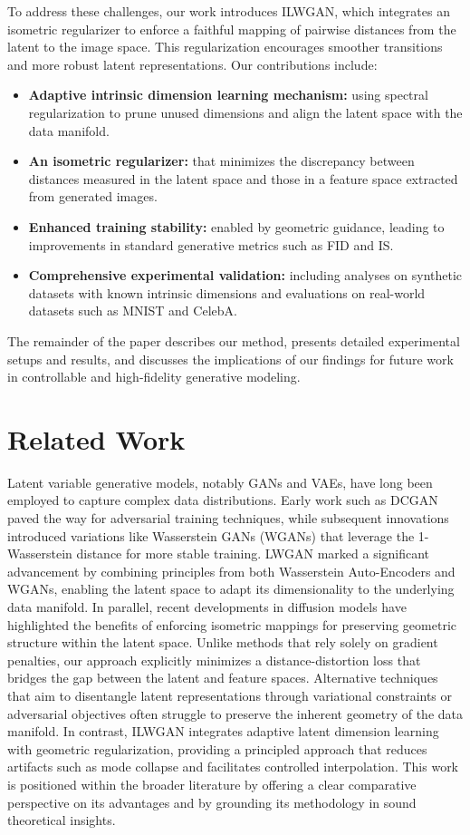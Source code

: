 \documentclass{article} %
\begin{document}
To address these challenges, our work introduces ILWGAN, which integrates an isometric regularizer to enforce a faithful mapping of pairwise distances from the latent to the image space. This regularization encourages smoother transitions and more robust latent representations. Our contributions include:
\begin{itemize}
  \item \textbf{Adaptive intrinsic dimension learning mechanism:} using spectral regularization to prune unused dimensions and align the latent space with the data manifold.
  \item \textbf{An isometric regularizer:} that minimizes the discrepancy between distances measured in the latent space and those in a feature space extracted from generated images.
  \item \textbf{Enhanced training stability:} enabled by geometric guidance, leading to improvements in standard generative metrics such as FID and IS.
  \item \textbf{Comprehensive experimental validation:} including analyses on synthetic datasets with known intrinsic dimensions and evaluations on real-world datasets such as MNIST\citep{Hughes2005} and CelebA\citep{Arridge2019}.
\end{itemize}
The remainder of the paper describes our method, presents detailed experimental setups and results, and discusses the implications of our findings for future work in controllable and high-fidelity generative modeling.

\section{Related Work}
\label{sec:related}
Latent variable generative models, notably GANs and VAEs, have long been employed to capture complex data distributions. Early work such as DCGAN\citep{Bauschke2016} paved the way for adversarial training techniques, while subsequent innovations introduced variations like Wasserstein GANs (WGANs) that leverage the 1-Wasserstein distance for more stable training. LWGAN marked a significant advancement by combining principles from both Wasserstein Auto-Encoders and WGANs, enabling the latent space to adapt its dimensionality to the underlying data manifold. In parallel, recent developments in diffusion models have highlighted the benefits of enforcing isometric mappings for preserving geometric structure within the latent space. Unlike methods that rely solely on gradient penalties, our approach explicitly minimizes a distance-distortion loss that bridges the gap between the latent and feature spaces. Alternative techniques that aim to disentangle latent representations through variational constraints or adversarial objectives often struggle to preserve the inherent geometry of the data manifold. In contrast, ILWGAN integrates adaptive latent dimension learning with geometric regularization, providing a principled approach that reduces artifacts such as mode collapse and facilitates controlled interpolation. This work is positioned within the broader literature by offering a clear comparative perspective on its advantages and by grounding its methodology in sound theoretical insights.
\end{document}
